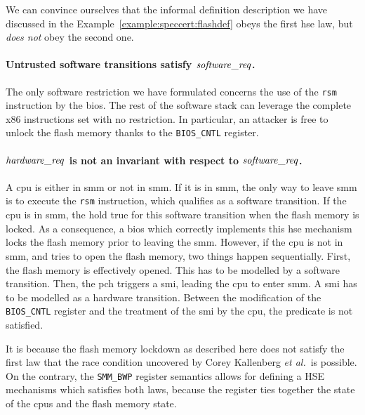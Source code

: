\begin{example}
  We can convince ourselves that the informal definition description we have
  discussed in the Example~\ref{example:speccert:flashdef} obeys the first
  \ac{hse} law, but \emph{does not} obey the second one.
  \paragraph{Untrusted software transitions satisfy $\mathit{software\_req}$.}
  The only software restriction we have formulated concerns the use of the
  \texttt{rsm} instruction by the \ac{bios}.
  The rest of the software stack can leverage the complete x86 instructions set
  with no restriction.
  In particular, an attacker is free to unlock the flash memory thanks to the
  \texttt{BIOS\_CNTL} register.

  \paragraph{$\mathit{hardware\_req}$ is not an invariant with respect to
    $\mathit{software\_req}$.}
  A \ac{cpu} is either in \ac{smm} or not in \ac{smm}.
  If it is in \ac{smm}, the only way to leave \ac{smm} is to execute the
  \texttt{rsm} instruction, which qualifies as a software transition.
  If the \ac{cpu} is in \ac{smm}, the  hold true for this
  software transition when the flash memory is locked.
  As a consequence, a \ac{bios} which correctly implements this \ac{hse}
  mechanism locks the flash memory prior to leaving the \ac{smm}.
  However, if the \ac{cpu} is not in \ac{smm}, and tries to open the flash
  memory, two things happen sequentially.
  First, the flash memory is effectively opened.
  This has to be modelled by a software transition.
  Then, the \ac{pch} triggers a \ac{smi}, leading the \ac{cpu} to enter
  \ac{smm}.
  A \ac{smi} has to be modelled as a hardware transition.
  Between the modification of the \texttt{BIOS\_CNTL} register and the treatment
  of the \ac{smi} by the \ac{cpu}, the  predicate is not
  satisfied.

  It is because the flash memory lockdown as described here does not satisfy the
  first law that the race condition uncovered by Corey Kallenberg \emph{et
    al.}\,\cite{kallenberg2015racecondition} is possible.
  On the contrary, the \texttt{SMM\_BWP} register semantics allows for defining
  a HSE mechanisms which satisfies both laws, because the register ties together
  the state of the \acp{cpu} and the flash memory state.
\end{example}

